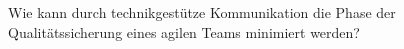 Wie kann durch technikgestütze Kommunikation die Phase der Qualitätssicherung eines agilen Teams minimiert werden?